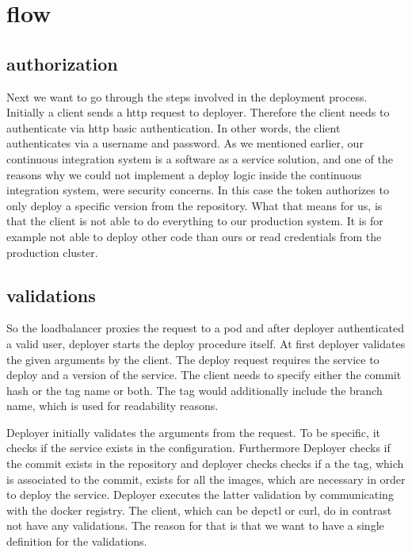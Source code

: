 \section{flow}

\subsection{authorization}

Next we want to go through the steps involved in the deployment process. Initially a
client sends a http request to deployer. Therefore the client needs to authenticate via
http basic authentication. In other words, the client authenticates via a username and
password. As we mentioned earlier, our continuous integration system is a software as a
service solution, and one of the reasons why we could not implement a deploy logic inside
the continuous integration system, were security concerns. In this case the token
authorizes to only deploy a specific version from the repository. What that means for us,
is that the client is not able to do everything to our production system. It is for
example not able to deploy other code than ours or read credentials from the production
cluster.

\subsection{validations}

So the loadbalancer proxies the request to a pod and after deployer authenticated a valid
user, deployer starts the deploy procedure itself. At first deployer validates the given
arguments by the client. The deploy request requires the service to deploy and a version
of the service. The client needs to specify either the commit hash or the tag name or
both. The tag would additionally include the branch name, which is used for readability
reasons.

Deployer initially validates the arguments from the request. To be specific, it checks if
the service exists in the configuration. Furthermore Deployer checks if the commit exists
in the repository and deployer checks checks if a the tag, which is associated to the
commit, exists for all the images, which are necessary in order to deploy the
service. Deployer executes the latter validation by communicating with the docker
registry. The client, which can be depctl or curl, do in contrast not have any
validations. The reason for that is that we want to have a single definition for the
validations.

